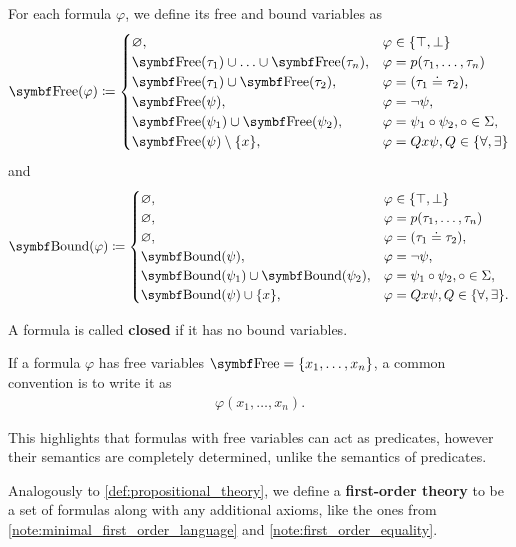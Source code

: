 \begin{definition}
  For each formula \( \varphi \), we define its free and bound variables as
  \begin{align*}
    \Bold{Free}(\varphi) \coloneqq \begin{cases}
      \varnothing,                                              &\varphi \in \{ \top, \bot \} \\
      \Bold{Free}(\tau_1) \cup \ldots \cup \Bold{Free}(\tau_n), &\varphi = p(\tau_1, \ldots, \tau_n) \\
      \Bold{Free}(\tau_1) \cup \Bold{Free}(\tau_2),             &\varphi = (\tau_1 \doteq \tau_2), \\
      \Bold{Free}(\psi),                                        &\varphi = \neg \psi, \\
      \Bold{Free}(\psi_1) \cup \Bold{Free}(\psi_2),             &\varphi = \psi_1 \circ \psi_2, \circ \in \Sigma, \\
      \Bold{Free}(\psi) \setminus \{ x \},                      &\varphi = Q x \psi, Q \in \{ \forall, \exists \}
    \end{cases}
  \end{align*}
  and
  \begin{align*}
    \Bold{Bound}(\varphi) \coloneqq \begin{cases}
      \varnothing,                                              &\varphi \in \{ \top, \bot \} \\
      \varnothing,                                              &\varphi = p(\tau_1, \ldots, \tau_n) \\
      \varnothing,                                              &\varphi = (\tau_1 \doteq \tau_2), \\
      \Bold{Bound}(\psi),                                       &\varphi = \neg \psi, \\
      \Bold{Bound}(\psi_1) \cup \Bold{Bound}(\psi_2),           &\varphi = \psi_1 \circ \psi_2, \circ \in \Sigma, \\
      \Bold{Bound}(\psi) \cup \{ x \},                          &\varphi = Q x \psi, Q \in \{ \forall, \exists \}.
    \end{cases}
  \end{align*}

  A formula is called \textbf{closed} if it has no bound variables.

  If a formula \( \varphi \) has free variables \( \Bold{Free} = \{ x_1, \ldots, x_n \} \), a common convention is to write it as
  \begin{align*}
    \varphi(x_1, \ldots, x_n).
  \end{align*}

  This highlights that formulas with free variables can act as predicates, however their semantics are completely determined, unlike the semantics of predicates.

  Analogously to \cref{def:propositional_theory}, we define a \textbf{first-order theory} to be a set of formulas along with any additional axioms, like the ones from \cref{note:minimal_first_order_language} and \cref{note:first_order_equality}.
\end{definition}

